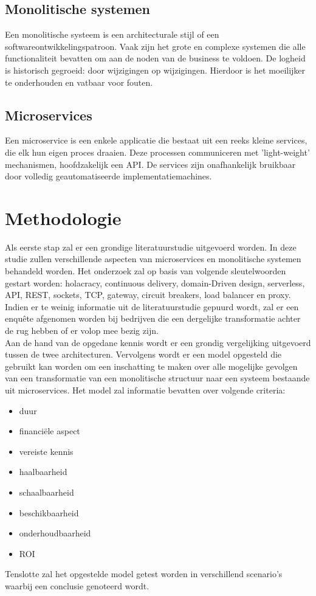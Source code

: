 \subsection{Monolitische systemen}
Een monolitische systeem is een architecturale stijl of een softwareontwikkelingspatroon. Vaak zijn het grote en complexe systemen die alle functionaliteit bevatten om aan de noden van de business te voldoen. De logheid is historisch gegroeid: door wijzigingen op wijzigingen. Hierdoor is het moeilijker te onderhouden en vatbaar voor fouten.
~\autocite{Monolith2014}

\subsection{Microservices}
Een microservice is een enkele applicatie die bestaat uit een reeks kleine services, die elk hun eigen proces draaien. Deze processen communiceren met 'light-weight' mechanismen, hoofdzakelijk een API. De services zijn onafhankelijk bruikbaar door volledig geautomatiseerde implementatiemachines. 
~\autocite{Microservices2014}

\section{Methodologie}
\label{sec:methodologie}

Als eerste stap zal er een grondige literatuurstudie uitgevoerd worden. In deze studie zullen verschillende aspecten van microservices en monolitische systemen behandeld worden. Het onderzoek zal op basis van volgende sleutelwoorden gestart worden: holacracy, continuous delivery, domain-Driven design, serverless, API, REST, sockets, TCP, gateway, circuit breakers, load balancer en proxy. ~\autocite{Glen2018} ~\autocite{Alshuqayran2016}
Indien er te weinig informatie uit de literatuurstudie gepuurd wordt, zal er een enquête afgenomen worden bij bedrijven die een dergelijke transformatie achter de rug hebben of er volop mee bezig zijn.\\
Aan de hand van de opgedane kennis wordt er een grondig vergelijking uitgevoerd tussen de twee architecturen. Vervolgens wordt er een model opgesteld die gebruikt kan worden om een inschatting te maken over alle mogelijke gevolgen van een transformatie van een monolitische structuur naar een systeem bestaande uit microservices. Het model zal informatie bevatten over volgende criteria:
\begin{itemize}
    \item duur
    \item financiële aspect
    \item vereiste kennis
    \item haalbaarheid
    \item schaalbaarheid
    \item beschikbaarheid
    \item onderhoudbaarheid
    \item ROI
\end{itemize} 
Tenslotte zal het opgestelde model getest worden in verschillend scenario’s waarbij een conclusie genoteerd wordt.

